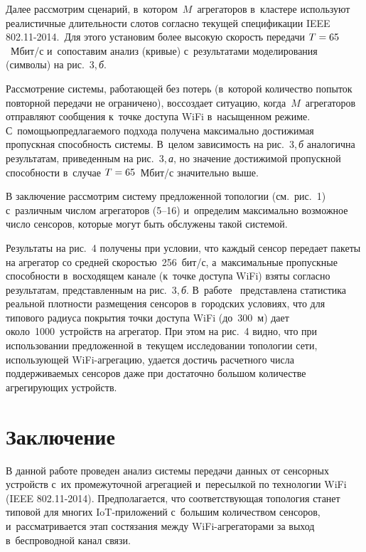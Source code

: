 \begin{multicols}{2}
    Далее рассмотрим сценарий, в~котором~$M$~агрегаторов в~кластере 
используют реалистичные длительности слотов согласно текущей 
спецификации IEEE 802.11-2014.\ Для этого установим более вы\-сокую 
скорость передачи $T\hm=65$~Мбит/с и~сопоставим анализ (кривые) 
с~результатами моделирования (символы) на рис.~3,\,\textit{б}.

    
    Рассмотрение системы, работающей без потерь (в~которой 
количество попыток повторной передачи не ограничено), воссоздает 
ситуацию, когда~$M$~агрегаторов отправляют сообщения к~точке 
доступа WiFi в~насыщенном режиме. С~по\-мощью\linebreak предлагаемого 
подхода получена максимально достижимая пропускная способность 
сис\-те\-мы. В~целом зависимость на рис.~3,\,\textit{б} аналогична результатам, 
приведенным на рис.~3,\,\textit{а}, но значение\linebreak 
достижимой пропускной 
способности в~случае $T\hm=65$~Мбит/с значительно выше. 
    
    В заключение рассмотрим систему предложенной топологии (см.\ 
рис.~1) с~различным числом агрегаторов (5--16) и~определим 
максимально возможное число сенсоров, которые могут быть обслужены 
такой системой.
 
Результаты на рис.~4 получены при условии, что каждый 
сенсор передает пакеты на агрегатор со средней скоростью~256~бит/с, 
а~максимальные пропускные способности в~восходящем канале (к~точке 
доступа WiFi) взяты согласно результатам, пред\-став\-лен\-ным на рис.~3,\,\textit{б}. 
В~работе~\cite{12-om} пред\-став\-ле\-на статистика реальной плот\-ности 
размещения сенсоров в~городских условиях, что для типового радиуса 
покрытия точки доступа WiFi (до~300~м) дает около~1000~устройств на 
агрегатор. При этом на рис.~4 видно, что при использовании 
предложенной в~текущем исследовании топологии сети, использующей 
WiFi-агре\-га\-цию, удается достичь расчетного числа поддерживаемых 
сенсоров даже при достаточно большом количестве агрегирующих 
устройств.


   
 \section{Заключение}
     
    В данной работе проведен анализ системы передачи данных от 
сенсорных устройств с~их промежуточной агрегацией и~пересылкой по 
технологии WiFi (IEEE 802.11-2014). Предполагается, что 
соответствующая топология станет типовой для многих  
IoT-при\-ло\-же\-ний с~большим количеством сенсоров, 
и~рассматривается этап состязания между WiFi-аг\-ре\-га\-то\-ра\-ми за выход 
в~беспроводной канал связи. 


\end{multicols}
